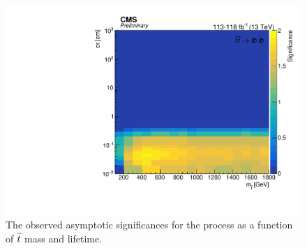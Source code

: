 \begin{figure}[hbtp]
\centering
\includegraphics[scale=0.5]{figures/results/significance_combined_lb.pdf}
\caption{The observed asymptotic significances for the \stoptolb process as a function of $\widetilde{t}$ mass and lifetime.}
\label{significance_combined_lb}
\end{figure}